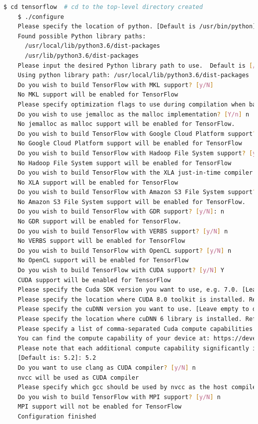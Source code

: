 \newpage
{}


\begin{lstlisting}[caption=Configure bazel for Tensorflow, label=list:configure_bazel, language=bash]
	$ cd tensorflow  # cd to the top-level directory created
	$ ./configure
	Please specify the location of python. [Default is /usr/bin/python]: /usr/bin/python3.6
	Found possible Python library paths:
	  /usr/local/lib/python3.6/dist-packages
	  /usr/lib/python3.6/dist-packages
	Please input the desired Python library path to use.  Default is [/usr/lib/python3.6/dist-packages]
	Using python library path: /usr/local/lib/python3.6/dist-packages
	Do you wish to build TensorFlow with MKL support? [y/N]
	No MKL support will be enabled for TensorFlow
	Please specify optimization flags to use during compilation when bazel option "--config=opt" is specified [Default is -march=native]:
	Do you wish to use jemalloc as the malloc implementation? [Y/n] n
	No jemalloc as malloc support will be enabled for TensorFlow.
	Do you wish to build TensorFlow with Google Cloud Platform support? [y/N] n
	No Google Cloud Platform support will be enabled for TensorFlow
	Do you wish to build TensorFlow with Hadoop File System support? [y/N] n
	No Hadoop File System support will be enabled for TensorFlow
	Do you wish to build TensorFlow with the XLA just-in-time compiler (experimental)? [y/N] n
	No XLA support will be enabled for TensorFlow
	Do you wish to build TensorFlow with Amazon S3 File System support? [Y/n]: n
	No Amazon S3 File System support will be enabled for TensorFlow.
	Do you wish to build TensorFlow with GDR support? [y/N]: n
	No GDR support will be enabled for TensorFlow.
	Do you wish to build TensorFlow with VERBS support? [y/N] n
	No VERBS support will be enabled for TensorFlow
	Do you wish to build TensorFlow with OpenCL support? [y/N] n
	No OpenCL support will be enabled for TensorFlow
	Do you wish to build TensorFlow with CUDA support? [y/N] Y
	CUDA support will be enabled for TensorFlow
	Please specify the Cuda SDK version you want to use, e.g. 7.0. [Leave empty to default to CUDA 8.0]: 8.0
	Please specify the location where CUDA 8.0 toolkit is installed. Refer to README.md for more details. [Default is /usr/local/cuda]:
	Please specify the cuDNN version you want to use. [Leave empty to default to cuDNN 6.0]: 6
	Please specify the location where cuDNN 6 library is installed. Refer to README.md for more details. [Default is /usr/local/cuda]:
	Please specify a list of comma-separated Cuda compute capabilities you want to build with.
	You can find the compute capability of your device at: https://developer.nvidia.com/cuda-gpus.
	Please note that each additional compute capability significantly increases your build time and binary size.
	[Default is: 5.2]: 5.2
	Do you want to use clang as CUDA compiler? [y/N] n
	nvcc will be used as CUDA compiler
	Please specify which gcc should be used by nvcc as the host compiler. [Default is /usr/bin/gcc]:
	Do you wish to build TensorFlow with MPI support? [y/N] n
	MPI support will not be enabled for TensorFlow
	Configuration finished
\end{lstlisting}


